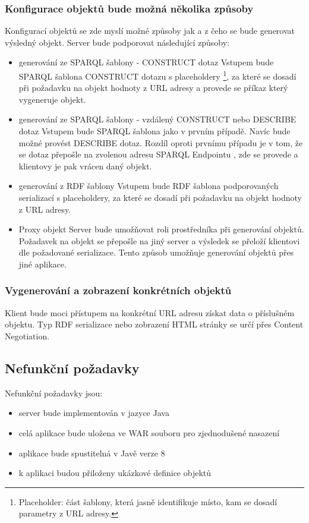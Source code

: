 \documentclass[thesis=B,czech]{FITthesis}[2012/06/26]
\begin{document}
  
  \subsubsection{Konfigurace objektů bude možná několika způsoby}  
  \label{sec:object_types}
  Konfigurací objektů se zde myslí možné způsoby jak a z čeho se bude generovat výsledný objekt. Server bude podporovat
  následující způsoby:
  \begin{itemize}
    \item generování ze SPARQL šablony - CONSTRUCT dotaz \cite{sparql_bob}
      \subitem Vstupem bude SPARQL šablona CONSTRUCT dotazu s placeholdery \footnote{Placeholder: část šablony, která jasně identifikuje místo, 
      kam se dosadí parametry z URL adresy.}, za které se dosadí při požadavku na objekt hodnoty z URL adresy
      a provede se příkaz který vygeneruje objekt.
      
     \item generování ze SPARQL šablony - vzdálený CONSTRUCT nebo DESCRIBE dotaz \cite{sparql_bob}
      \subitem Vstupem bude SPARQL šablona jako v prvním případě. Navíc bude možné provést DESCRIBE dotaz. Rozdíl oproti prvnímu případu je v tom, že se 
      dotaz přepošle na zvolenou adresu SPARQL Endpointu \cite{sparql_bob}, zde se provede a klientovy je pak vrácen daný objekt.
      
    \item generování z RDF šablony
     \subitem Vstupem bude RDF šablona podporovaných serializací s placeholdery, za které se dosadí při požadavku na objekt hodnoty z URL adresy. 
     
     \item Proxy objekt
      \subitem Server bude umožňovat roli prostředníka při generování objektů. Požadavek na objekt se přepošle na jiný server a výsledek se přeloží
      klientovi dle požadované serializace. Tento způsob umožňuje generování objektů přes jiné aplikace.
 \end{itemize}
 
 
  
  \subsubsection{Vygenerování a zobrazení konkrétních objektů}  
  Klient bude moci přístupem na konkrétní URL adresu získat data o příslušném objektu. Typ RDF serializace nebo zobrazení HTML stránky se určí přes 
  Content Negotiation.

\subsection{Nefunkční požadavky}
Nefunkční požadavky jsou:
\begin{itemize}
    \item server bude implementován v jazyce Java
    \item celá aplikace bude uložena ve WAR souboru pro zjednodušené nasazení
    \item aplikace bude spustitelná v Javě verze 8
    \item k aplikaci budou přiloženy ukázkové definice objektů
 \end{itemize}
 
\end{document}
